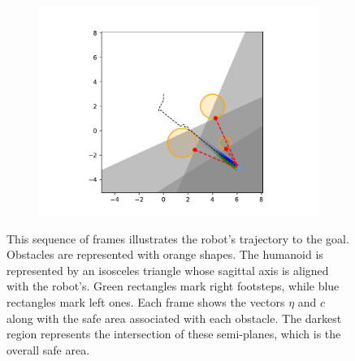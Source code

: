 \begin{figure}[H]
\begin{subfigure}{0.20\textwidth}
        \includegraphics[width=\textwidth]{figures/Simulations/sim1circles/frame_9.pdf}
    \end{subfigure}
    
    \caption[short]{This sequence of frames illustrates the robot's trajectory to the goal. Obstacles are represented with orange shapes. The humanoid is represented by an isosceles triangle whose sagittal axis is aligned with the robot's. Green rectangles mark right footsteps, while blue rectangles mark left ones. Each frame shows the vectors $\eta$ and $c$ along with the safe area associated with each obstacle. The darkest region represents the intersection of these semi-planes, which is the overall safe area.}
    \label{fig:sim1_frames}
\end{figure}